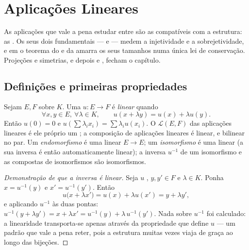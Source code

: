 \chapter{Aplicações Lineares}\label{ch:b1:linmaps}

As aplicações que vale a pena estudar entre  são as
compatíveis com a estrutura: as \emph{}. Os seus
dois  fundamentais ---  e  --- medem a
injetividade e a sobrejetividade, e em  o teorema do
 e da  amarra os seus tamanhos numa única lei de
conservação. Projeções e simetrias, e depois  e
, fecham o capítulo.

\section{Definições e primeiras propriedades}

\begin{definition}\label{def:b1:linmaps:def}
Sejam $E, F$  sobre $K$. Uma  $u \colon E \to F$ é
\emph{linear} quando
\[
\forall x, y \in E,\ \forall \lambda \in K, \qquad
u(x + \lambda y) = u(x) + \lambda u(y).
\]
Então $u(0) = 0$ e $u(\sum \lambda_i x_i) = \sum \lambda_i u(x_i)$.
O  $\mathcal{L}(E, F)$ das aplicações lineares é ele próprio um ; a composição de aplicações lineares é linear, e bilinear
no par. Um \emph{endomorfismo} é uma  linear $E \to E$; um
\emph{isomorfismo} é uma  linear  (a sua inversa é
então automaticamente linear); a inversa $u^{-1}$ de um isomorfismo
e as compostas de isomorfismos são isomorfismos.
\end{definition}

\begin{proof}[Demonstração de que a inversa é linear]
Seja $u$  , $y, y' \in F$ e $\lambda \in K$.
Ponha $x = u^{-1}(y)$ e $x' = u^{-1}(y')$. Então
\[
u\bigl(x + \lambda x'\bigr) = u(x) + \lambda u(x')
= y + \lambda y' ,
\]
e aplicando $u^{-1}$ às duas pontas: $u^{-1}(y + \lambda y') = x
+ \lambda x' = u^{-1}(y) + \lambda\,u^{-1}(y')$. Nada sobre $u^{-1}$ foi
calculado: a linearidade transporta-se apenas através da propriedade
que define $u$ --- um padrão que vale a pena reter, pois a estrutura
muitas vezes viaja de graça ao longo das bijeções.
\end{proof}

